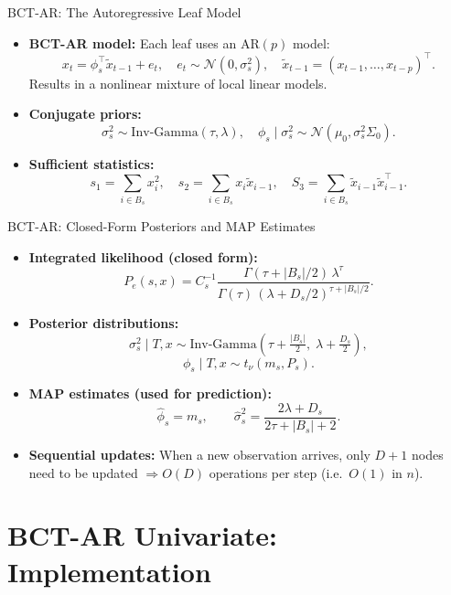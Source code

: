 \documentclass[10pt]{beamer}
\begin{document}
\begin{frame}{BCT-AR: The Autoregressive Leaf Model}
\begin{itemize}
    \item \textbf{BCT-AR model:} Each leaf uses an AR$(p)$ model:
    \[
    x_t = \phi_s^\top \tilde{x}_{t-1} + e_t, \quad e_t \sim \mathcal{N}(0,\sigma_s^2),\quad
    \tilde{x}_{t-1}=(x_{t-1},\dots,x_{t-p})^\top.
    \]
    Results in a nonlinear mixture of local linear models.

    \item \textbf{Conjugate priors:}
    \[
    \sigma_s^2 \sim \mathrm{Inv\text{-}Gamma}(\tau,\lambda), \quad
    \phi_s \mid \sigma_s^2 \sim \mathcal{N}(\mu_0,\sigma_s^2\Sigma_0).
    \]

    \item \textbf{Sufficient statistics:}
    \[
    s_1=\sum_{i\in B_s}x_i^2,\quad
    s_2=\sum_{i\in B_s}x_i \tilde{x}_{i-1},\quad
    S_3=\sum_{i\in B_s}\tilde{x}_{i-1}\tilde{x}_{i-1}^\top.
    \]
\end{itemize}
\end{frame}

\begin{frame}{BCT-AR: Closed-Form Posteriors and MAP Estimates}
\begin{itemize}
    \item \textbf{Integrated likelihood (closed form):}
    \[
    P_e(s,x)=
    C_s^{-1}
    \frac{\Gamma(\tau+|B_s|/2)\,\lambda^\tau}
    {\Gamma(\tau)\,(\lambda+D_s/2)^{\tau+|B_s|/2}}.
    \]

    \item \textbf{Posterior distributions:}
    \[
    \sigma_s^2 \mid T,x \sim \mathrm{Inv\text{-}Gamma}\!\left(\tau+\tfrac{|B_s|}{2},\; \lambda+\tfrac{D_s}{2}\right),
    \]
    \[
    \phi_s \mid T,x \sim t_\nu(m_s, P_s).
    \]

    \item \textbf{MAP estimates (used for prediction):}
    \[
    \hat{\phi}_s = m_s, \qquad
    \hat{\sigma}_s^2 = \frac{2\lambda+D_s}{2\tau+|B_s|+2}.
    \]

    \item \textbf{Sequential updates:} When a new observation arrives, only $D+1$ nodes need to be updated $\Rightarrow O(D)$ operations per step (i.e.\ $O(1)$ in $n$).
\end{itemize}
\end{frame}

\section{BCT-AR Univariate: Implementation}
\end{document}
